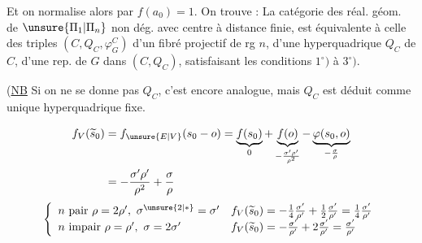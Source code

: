 
Et on normalise alors par $f(a_0)=1$.
On trouve : La catégorie des réal. géom. de $\unsure{\Pi_1|\Pi_n}$ non dég.
avec centre à distance finie, est équivalente à celle des triples
$(C,Q_C,\varphi_G^C)$ d'un fibré projectif de rg $n$,
d'une hyperquadrique $Q_C$ de $C$, d'une rep. de $G$ dans $(C,Q_C)$,
satisfaisant les conditions $1^\circ)$ à $3^\circ)$.


(\uline{NB} Si on ne se donne pas $Q_C$, c'est encore analogue,
mais  $Q_C$ est déduit 
comme unique hyperquadrique fixe.


\[
\begin{aligned}
f_V(\widetilde s_0)
&=f_{\unsure{E|V}}(s_0-o)
=\underbrace{f(s_0)}_0+
\underbrace{f(o)}_{-\frac{\sigma'\rho'}{\rho^2}}
-\underbrace{\varphi(s_0,o)}_{-\frac{\sigma}{\rho}}\\
&=-\frac{\sigma'\rho'}{\rho^2}+\frac{\sigma}{\rho}
\end{aligned}
\]
\[
\left\{\begin{array}{ll}
n\text{ pair }\rho=2\rho',\ \sigma^{\unsure{2|*}}=\sigma'
&
f_V(\widetilde s_0)=-\frac14\frac{\sigma'}{\rho'}
+\frac12\frac{\sigma'}{\rho'}=\frac14\frac{\sigma'}{\rho'}\\
n\text{ impair }\rho=\rho',\ \sigma=2\sigma'
&
f_V(\widetilde s_0)=-\frac{\sigma'}{\rho'}
+2\frac{\sigma'}{\rho'}=\frac{\sigma'}{\rho'}
\end{array}\right.
\]

